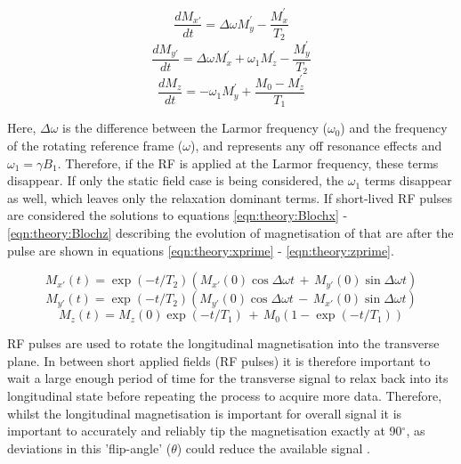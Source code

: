 \begin{equation}
    \frac{dM_{x'}}{dt} = \Delta\omega M_y^{'} - \frac{M_x^{'}}{T_2}
    \label{eqn:theory:Blochx}
\end{equation}
\begin{equation}
    \frac{dM_{y'}}{dt} = \Delta\omega M_x^{'} + \omega_1M_z^{'} - \frac{M_y^{'}}{T_2}
    \label{eqn:theory:Blochy}
\end{equation}
\begin{equation}
    \frac{dM_z}{dt} = -\omega_1M_y^{'} + \frac{M_0-M_z^{'}}{T_1}
    \label{eqn:theory:Blochz}
\end{equation}

Here, $\Delta\omega$ is the difference between the Larmor frequency ($\omega_0$) and the frequency of the rotating reference frame ($\omega$), and represents any off resonance effects and $\omega_1=\gamma B_1$. Therefore, if the \ac{RF} is applied at the Larmor frequency, these terms disappear. If only the static field case is being considered, the $\omega_1$ terms disappear as well, which leaves only the relaxation dominant terms. If short-lived \ac{RF} pulses are considered the solutions to equations \ref{eqn:theory:Blochx} - \ref{eqn:theory:Blochz} describing the evolution of magnetisation of that are after the pulse are shown in equations \ref{eqn:theory:xprime} - \ref{eqn:theory:zprime}.

\begin{equation}
    M_{x'}(t) = \exp(-t/T_2) \left( M_{x'}(0)\cos\Delta\omega t \, + \, M_{y'}(0)\sin\Delta\omega t \right)
    \label{eqn:theory:xprime}
\end{equation}
\begin{equation}
    M_{y'}(t) = \exp(-t/T_2) \left( M_{y'}(0)\cos\Delta\omega t \, - \, M_{x'}(0)\sin\Delta\omega t \right)
\end{equation}
\begin{equation}
    M_z(t) = M_z(0)\exp(-t/T_1) \, + \, M_0 \left( 1-\exp(-t/T_1) \right)
    \label{eqn:theory:zprime}
\end{equation}

RF pulses are used to rotate the longitudinal magnetisation into the transverse plane. In between short applied fields (\ac{RF} pulses) it is therefore important to wait a large enough period of time for the transverse signal to relax back into its longitudinal state before repeating the process to acquire more data. Therefore, whilst the longitudinal magnetisation is important for overall signal it is important to accurately and reliably tip the magnetisation exactly at 90$^\circ$, as deviations in this 'flip-angle' ($\theta$) could reduce the available signal \cite{deGraaf2019InSpectroscopy}.

